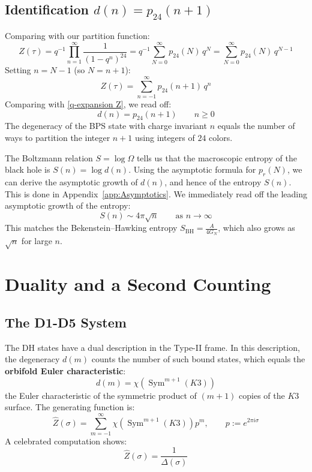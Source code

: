 \subsection{Identification $d(n) = p_{24}(n+1)$}

Comparing with our partition function:
\begin{equation}
    Z(\tau) = q^{-1}\prod_{n=1}^{\infty}\frac{1}{(1-q^n)^{24}}
    = q^{-1}\sum_{N=0}^{\infty} p_{24}(N)\,q^N
    = \sum_{N=0}^{\infty} p_{24}(N)\, q^{N-1}
\end{equation}
Setting $n = N-1$ (so $N = n+1$):
\begin{equation}
    Z(\tau) = \sum_{n=-1}^{\infty} p_{24}(n+1)\,q^n
\end{equation}
Comparing with \eqref{q-expansion Z}, we read off:
\begin{equation}\label{d=p24}
    \boxed{d(n) = p_{24}(n+1)} \qquad n \geq 0
\end{equation}
The degeneracy of the BPS state with charge invariant $n$ equals the number 
of ways to partition the integer $n+1$ using integers of $24$ colors.

The Boltzmann relation $S = \log \Omega$ tells us that the macroscopic entropy of the black hole is $S(n) = \log d(n)$. Using the asymptotic formula for $p_r(N)$, we can derive the asymptotic growth of $d(n)$, and hence of the entropy $S(n)$. This is done in Appendix~\ref{app:Asymptotics}. We immediately read off the leading asymptotic growth of the entropy:
\begin{equation}
    S(n) \sim 4\pi \sqrt{n} \qquad \text{as } n \to \infty
\end{equation}
This matches the Bekenstein--Hawking entropy $S_{\text{BH}} = \frac{A}{4G_N}$, which also grows as $\sqrt{n}$ for large $n$. 

\section{Duality and a Second Counting}

\subsection{The D1-D5 System}

The DH states have a dual description in the Type-II frame.
In this description, the degeneracy $d(m)$ counts the number of such bound 
states, which equals the \textbf{orbifold Euler characteristic}:
\begin{equation}
    d(m) = \chi\!\left(\operatorname{Sym}^{m+1}(K3)\right)
\end{equation}
the Euler characteristic of the symmetric product of $(m+1)$ copies of the 
$K3$ surface. The generating function is:
\begin{equation}\label{Z-hat}
    \hat{Z}(\sigma) = \sum_{m=-1}^{\infty} \chi\!\left(\operatorname{Sym}^{m+1}(K3)\right) 
    p^m, \qquad p := e^{2\pi i\sigma}
\end{equation}
A celebrated computation shows:
\begin{equation}\label{Zhat=1/Delta}
    \hat{Z}(\sigma) = \frac{1}{\Delta(\sigma)}
\end{equation}

